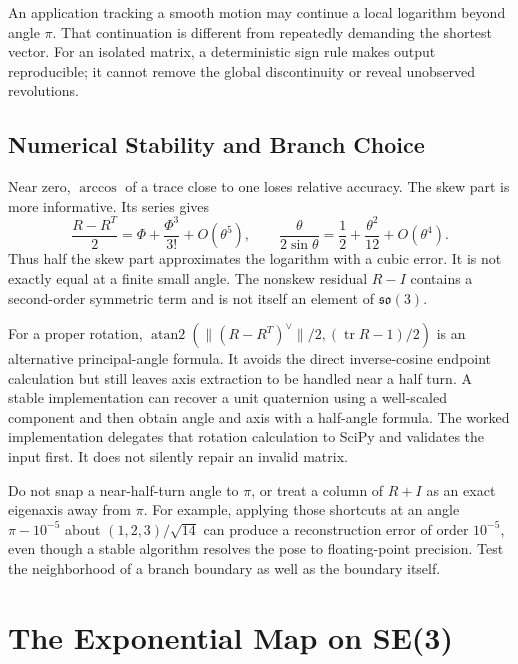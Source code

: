 An application tracking a smooth motion may continue a local logarithm beyond angle $\pi$. That continuation is different from repeatedly demanding the shortest vector. For an isolated matrix, a deterministic sign rule makes output reproducible; it cannot remove the global discontinuity or reveal unobserved revolutions.

\subsection{Numerical Stability and Branch Choice}
\label{sec:log_numerical_stability}

Near zero, $\arccos$ of a trace close to one loses relative accuracy. The skew part is more informative. Its series gives
\begin{equation}
 \frac{R-R^T}{2}=\Phi+\frac{\Phi^3}{3!}+O(\theta^5),\qquad
 \frac{\theta}{2\sin\theta}=\frac12+\frac{\theta^2}{12}+O(\theta^4).
 \label{eq:log_taylor}
\end{equation}
Thus half the skew part approximates the logarithm with a cubic error. It is not exactly equal at a finite small angle. The nonskew residual $R-I$ contains a second-order symmetric term and is not itself an element of $\mathfrak{so}(3)$.

For a proper rotation, $\operatorname{atan2}(\|(R-R^T)^\vee\|/2,(\operatorname{tr}R-1)/2)$ is an alternative principal-angle formula. It avoids the direct inverse-cosine endpoint calculation but still leaves axis extraction to be handled near a half turn. A stable implementation can recover a unit quaternion using a well-scaled component and then obtain angle and axis with a half-angle formula. The worked implementation delegates that rotation calculation to SciPy and validates the input first. It does not silently repair an invalid matrix.

Do not snap a near-half-turn angle to $\pi$, or treat a column of $R+I$ as an exact eigenaxis away from $\pi$. For example, applying those shortcuts at an angle $\pi-10^{-5}$ about $(1,2,3)/\sqrt{14}$ can produce a reconstruction error of order $10^{-5}$, even though a stable algorithm resolves the pose to floating-point precision. Test the neighborhood of a branch boundary as well as the boundary itself.

\section{The Exponential Map on SE(3)}
\label{sec:exp_se3}

